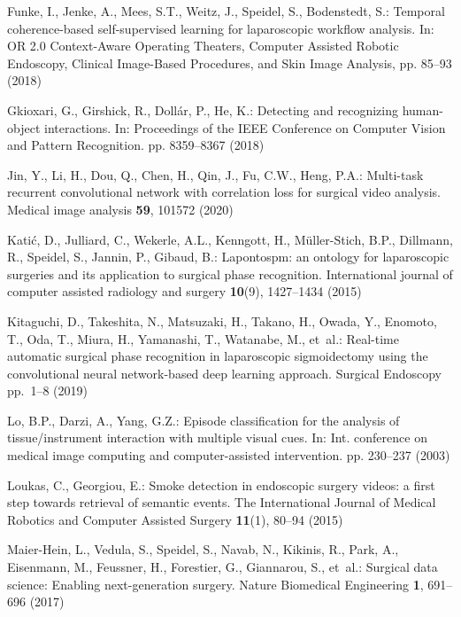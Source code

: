 \documentclass[english,runningheads,a4paper]{llncs}
\begin{document}
\begin{thebibliography}{10}
Funke, I., Jenke, A., Mees, S.T., Weitz, J., Speidel, S., Bodenstedt, S.:
  Temporal coherence-based self-supervised learning for laparoscopic workflow
  analysis. In: OR 2.0 Context-Aware Operating Theaters, Computer Assisted
  Robotic Endoscopy, Clinical Image-Based Procedures, and Skin Image Analysis,
  pp. 85--93 (2018)

Gkioxari, G., Girshick, R., Doll{\'a}r, P., He, K.: Detecting and recognizing
  human-object interactions. In: Proceedings of the IEEE Conference on Computer
  Vision and Pattern Recognition. pp. 8359--8367 (2018)

Jin, Y., Li, H., Dou, Q., Chen, H., Qin, J., Fu, C.W., Heng, P.A.: Multi-task
  recurrent convolutional network with correlation loss for surgical video
  analysis. Medical image analysis  \textbf{59},  101572 (2020)

Kati{\'c}, D., Julliard, C., Wekerle, A.L., Kenngott, H., M{\"u}ller-Stich,
  B.P., Dillmann, R., Speidel, S., Jannin, P., Gibaud, B.: Lapontospm: an
  ontology for laparoscopic surgeries and its application to surgical phase
  recognition. International journal of computer assisted radiology and surgery
   \textbf{10}(9),  1427--1434 (2015)

Kitaguchi, D., Takeshita, N., Matsuzaki, H., Takano, H., Owada, Y., Enomoto,
  T., Oda, T., Miura, H., Yamanashi, T., Watanabe, M., et~al.: Real-time
  automatic surgical phase recognition in laparoscopic sigmoidectomy using the
  convolutional neural network-based deep learning approach. Surgical Endoscopy
  pp.~1--8 (2019)

Lo, B.P., Darzi, A., Yang, G.Z.: Episode classification for the analysis of
  tissue/instrument interaction with multiple visual cues. In: Int. conference
  on medical image computing and computer-assisted intervention. pp. 230--237
  (2003)

Loukas, C., Georgiou, E.: Smoke detection in endoscopic surgery videos: a first
  step towards retrieval of semantic events. The International Journal of
  Medical Robotics and Computer Assisted Surgery  \textbf{11}(1),  80--94
  (2015)

Maier-Hein, L., Vedula, S., Speidel, S., Navab, N., Kikinis, R., Park, A.,
  Eisenmann, M., Feussner, H., Forestier, G., Giannarou, S., et~al.: Surgical
  data science: Enabling next-generation surgery. Nature Biomedical Engineering
   \textbf{1},  691--696 (2017)


\end{thebibliography}
\end{document}

